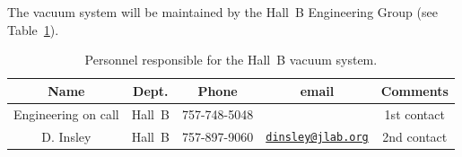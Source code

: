 The vacuum system will be maintained by the Hall~B Engineering Group (see
Table~\ref{tb:vacuum}).  

\begin{table}[!htb]
\centering
\begin{tabular}{|c|c|c|c|c|} \hline
Name&Dept.&Phone&email&Comments \\ \hline
Engineering on call & Hall~B& 757-748-5048&& 1st contact  \\ \hline
D. Insley & Hall~B  &757-897-9060&\href{mailto:dinsley@jlab.org}{\nolinkurl{dinsley@jlab.org}}  &2nd contact \\ \hline
 \end{tabular}
\caption{Personnel responsible for the Hall~B vacuum system.} 
\label{tb:vacuum}
\end{table}

